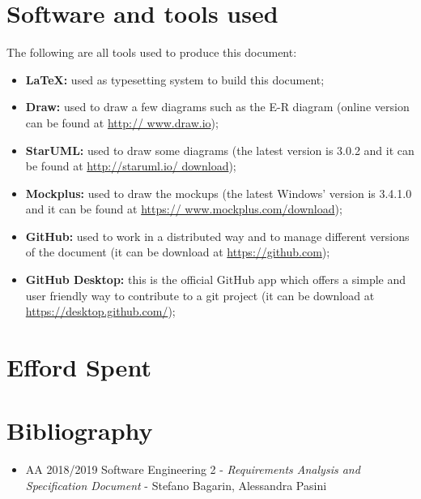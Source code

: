 \section{Software and tools used}
The following are all tools used to produce this document:
\begin{itemize}
	\item \textbf{\LaTeX:} used as typesetting system to build this document;
	\item \textbf{Draw:} used to draw a few diagrams such as the E-R diagram (online version can be found at \url{http://				www.draw.io});
	\item \textbf{StarUML:} used to draw some diagrams (the latest version is 3.0.2 and it can be found at \url{http://staruml.io/			download});
	\item \textbf{Mockplus:} used to draw the mockups (the latest Windows' version is 3.4.1.0 and it can be found at \url{https://			www.mockplus.com/download});
	\item \textbf{GitHub:} used to work in a distributed way and to manage different versions of the document (it can be download at		\url{https://github.com});
	\item \textbf{GitHub Desktop:} this is the official GitHub app which offers a simple and user friendly way to contribute to a git 			project (it can be download at \url{https://desktop.github.com/});
\end{itemize}
\section{Efford Spent}

\section{Bibliography}
\begin{itemize}
	\item AA 2018/2019 Software Engineering 2 - \emph{Requirements Analysis and Specification Document} - Stefano Bagarin, 			Alessandra Pasini
\end{itemize}
